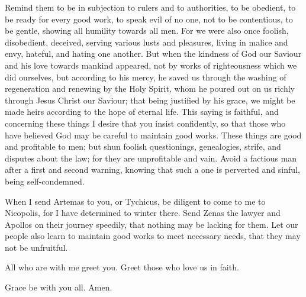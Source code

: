  Remind them to be in subjection to rulers and to
authorities, to be obedient, to be ready for every good work,
 to speak evil of no one, not to be contentious, to be
gentle, showing all humility towards all men.  For we were
also once foolish, disobedient, deceived, serving various lusts and
pleasures, living in malice and envy, hateful, and hating one another.
 But when the kindness of God our Saviour and his love
towards mankind appeared,  not by works of righteousness
which we did ourselves, but according to his mercy, he saved us through
the washing of regeneration and renewing by the Holy Spirit,
 whom he poured out on us richly through Jesus Christ our
Saviour;  that being justified by his grace, we might be
made heirs according to the hope of eternal life.  This
saying is faithful, and concerning these things I desire that you insist
confidently, so that those who have believed God may be careful to
maintain good works. These things are good and profitable to men;
 but shun foolish questionings, genealogies, strife, and
disputes about the law; for they are unprofitable and vain.
 Avoid a factious man after a first and second warning,
 knowing that such a one is perverted and sinful, being
self-condemned.

 When I send Artemas to you, or Tychicus, be diligent to
come to me to Nicopolis, for I have determined to winter there.
 Send Zenas the lawyer and Apollos on their journey
speedily, that nothing may be lacking for them.  Let our
people also learn to maintain good works to meet necessary needs, that
they may not be unfruitful.

 All who are with me greet you. Greet those who love us in
faith.

Grace be with you all. Amen.
